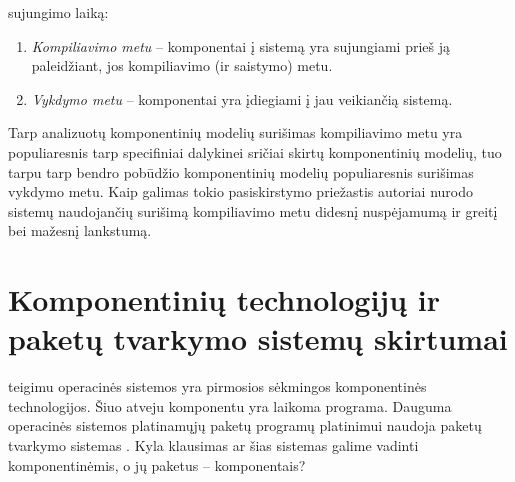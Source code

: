\begin{enumerate}
    sujungimo laiką:
    \begin{enumerate}
      \item \emph{Kompiliavimo metu} – komponentai į sistemą yra sujungiami
        prieš ją paleidžiant, jos kompiliavimo (ir saistymo) metu.
      \item \emph{Vykdymo metu} – komponentai yra įdiegiami į jau veikiančią
        sistemą.
    \end{enumerate}
    Tarp analizuotų komponentinių modelių surišimas kompiliavimo
    metu yra populiaresnis tarp specifiniai dalykinei sričiai skirtų
    komponentinių modelių, tuo tarpu tarp bendro pobūdžio
    komponentinių modelių populiaresnis surišimas vykdymo metu.
    Kaip galimas tokio pasiskirstymo priežastis autoriai nurodo
    sistemų naudojančių surišimą kompiliavimo metu didesnį
    nuspėjamumą ir greitį bei mažesnį lankstumą.
\end{enumerate}

\section{Komponentinių technologijų ir paketų tvarkymo sistemų skirtumai}


\cite[12]{cs-beyond-object-oriented-programming} teigimu operacinės
sistemos yra pirmosios sėkmingos komponentinės technologijos. Šiuo
atveju komponentu yra laikoma programa. Dauguma 
operacinės sistemos platinamųjų paketų  programų
platinimui naudoja paketų tvarkymo sistemas . Kyla klausimas ar šias sistemas galime vadinti komponentinėmis,
o jų paketus – komponentais?

